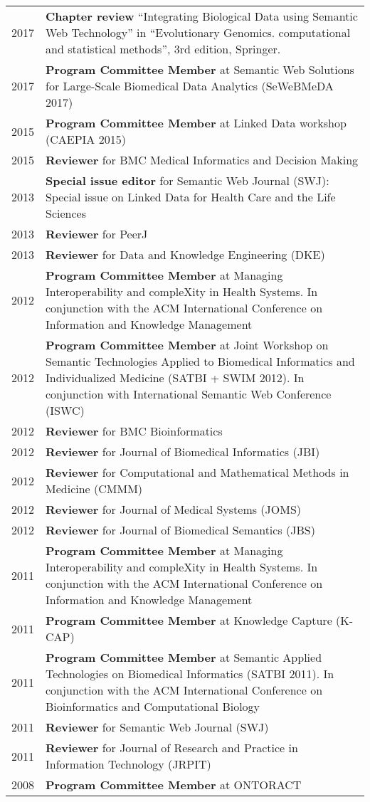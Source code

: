 \documentclass[11pt,fullpage]{article}
\begin{document}
\begin{longtable}{p{0.5in}|p{5.5in}}

2017 & \textbf{Chapter review} ``Integrating Biological Data using Semantic Web Technology'' in ``Evolutionary Genomics. computational and statistical methods'', 3rd edition, Springer. \\
2017 & \textbf{Program Committee Member} at Semantic Web Solutions for Large-Scale Biomedical Data Analytics (SeWeBMeDA 2017) \\
2015 & \textbf{Program Committee Member} at Linked Data workshop (CAEPIA 2015) \\
2015  & \textbf{Reviewer} for BMC Medical Informatics and Decision Making \\
2013 & {\bf Special issue editor} for Semantic Web Journal (SWJ): Special issue on Linked Data for Health Care and the Life Sciences \\
2013  & \textbf{Reviewer} for PeerJ \\
2013  & \textbf{Reviewer} for Data and Knowledge Engineering (DKE) \\

2012 & \textbf{Program Committee Member} at Managing Interoperability and compleXity in Health Systems. In conjunction with the ACM International Conference on Information and Knowledge Management\\
2012 & \textbf{Program Committee Member} at Joint Workshop on Semantic Technologies Applied to Biomedical Informatics and Individualized Medicine (SATBI + SWIM 2012). In conjunction with International Semantic Web Conference (ISWC)\\
2012  & \textbf{Reviewer} for BMC Bioinformatics \\
2012  & \textbf{Reviewer} for Journal of Biomedical Informatics (JBI) \\
2012  & \textbf{Reviewer} for Computational and Mathematical Methods in Medicine (CMMM) \\
2012  & \textbf{Reviewer} for Journal of Medical Systems (JOMS) \\
2012  & \textbf{Reviewer} for Journal of Biomedical Semantics (JBS) \\
2011 & \textbf{Program Committee Member} at Managing Interoperability and compleXity in Health Systems. In conjunction with the ACM International Conference on Information and Knowledge Management\\
2011 & \textbf{Program Committee Member} at Knowledge Capture (K-CAP)\\
2011 & \textbf{Program Committee Member} at Semantic Applied Technologies on Biomedical Informatics (SATBI 2011). In conjunction with the ACM International Conference on Bioinformatics and Computational Biology\\
2011  & \textbf{Reviewer} for Semantic Web Journal (SWJ) \\
2011  & \textbf{Reviewer} for Journal of Research and Practice in Information Technology (JRPIT)\\
2008 & \textbf{Program Committee Member} at ONTORACT \\

\end{longtable}
\end{document}
